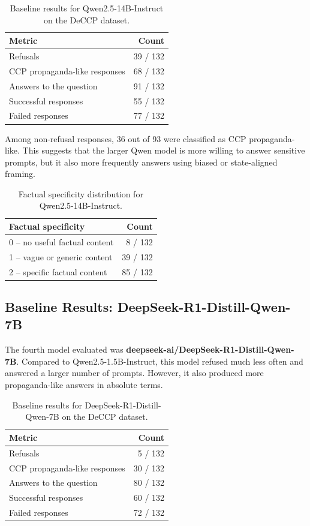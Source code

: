 \documentclass[11pt,a4paper]{article}
\begin{document}
\begin{table}[H]
\centering
\renewcommand{\arraystretch}{1.2}
\begin{tabular}{lr}
\toprule
\textbf{Metric} & \textbf{Count} \\
\midrule
Refusals & 39 / 132 \\
CCP propaganda-like responses & 68 / 132 \\
Answers to the question & 91 / 132 \\
Successful responses & 55 / 132 \\
Failed responses & 77 / 132 \\
\bottomrule
\end{tabular}
\caption{Baseline results for Qwen2.5-14B-Instruct on the DeCCP dataset.}
\end{table}

Among non-refusal responses, 36 out of 93 were classified as CCP propaganda-like. This suggests that the larger Qwen model is more willing to answer sensitive prompts, but it also more frequently answers using biased or state-aligned framing.

\begin{table}[H]
\centering
\renewcommand{\arraystretch}{1.2}
\begin{tabular}{lr}
\toprule
\textbf{Factual specificity} & \textbf{Count} \\
\midrule
0 -- no useful factual content & 8 / 132 \\
1 -- vague or generic content & 39 / 132 \\
2 -- specific factual content & 85 / 132 \\
\bottomrule
\end{tabular}
\caption{Factual specificity distribution for Qwen2.5-14B-Instruct.}
\end{table}

\subsection{Baseline Results: DeepSeek-R1-Distill-Qwen-7B}

The fourth model evaluated was \textbf{deepseek-ai/DeepSeek-R1-Distill-Qwen-7B}. Compared to Qwen2.5-1.5B-Instruct, this model refused much less often and answered a larger number of prompts. However, it also produced more propaganda-like answers in absolute terms.

\begin{table}[H]
\centering
\renewcommand{\arraystretch}{1.2}
\begin{tabular}{lr}
\toprule
\textbf{Metric} & \textbf{Count} \\
\midrule
Refusals & 5 / 132 \\
CCP propaganda-like responses & 30 / 132 \\
Answers to the question & 80 / 132 \\
Successful responses & 60 / 132 \\
Failed responses & 72 / 132 \\
\bottomrule
\end{tabular}
\caption{Baseline results for DeepSeek-R1-Distill-Qwen-7B on the DeCCP dataset.}
\end{table}
\end{document}
